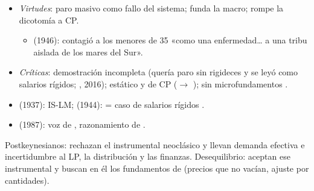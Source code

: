 \documentclass{article}
\begin{document}
\begin{columnas}
\begin{itemize}
\item \emph{Virtudes}: paro masivo como fallo del sistema; funda la macro; rompe la dicotomía a CP.
  \begin{itemize}
  \item {} (1946): contagió a los menores de 35 «como una enfermedad\ldots{} a una tribu aislada de los mares del Sur».
  \end{itemize}
\item \emph{Críticas}: demostración incompleta (quería paro sin rigideces y se leyó como salarios rígidos; , 2016); estático y de CP ($\to$ ); sin microfundamentos .
\item {} (1937): IS-LM;  (1944):  = caso de salarios rígidos .
\item {} (1987): voz de , razonamiento de .
\end{itemize}

\begin{ideaclave}
Postkeynesianos: rechazan el instrumental neoclásico y llevan demanda efectiva e incertidumbre al LP, la distribución y las finanzas. Desequilibrio: aceptan ese instrumental y buscan en él los fundamentos de  (precios que no vacían, ajuste por cantidades).
\end{ideaclave}


\end{columnas}
\end{document}
